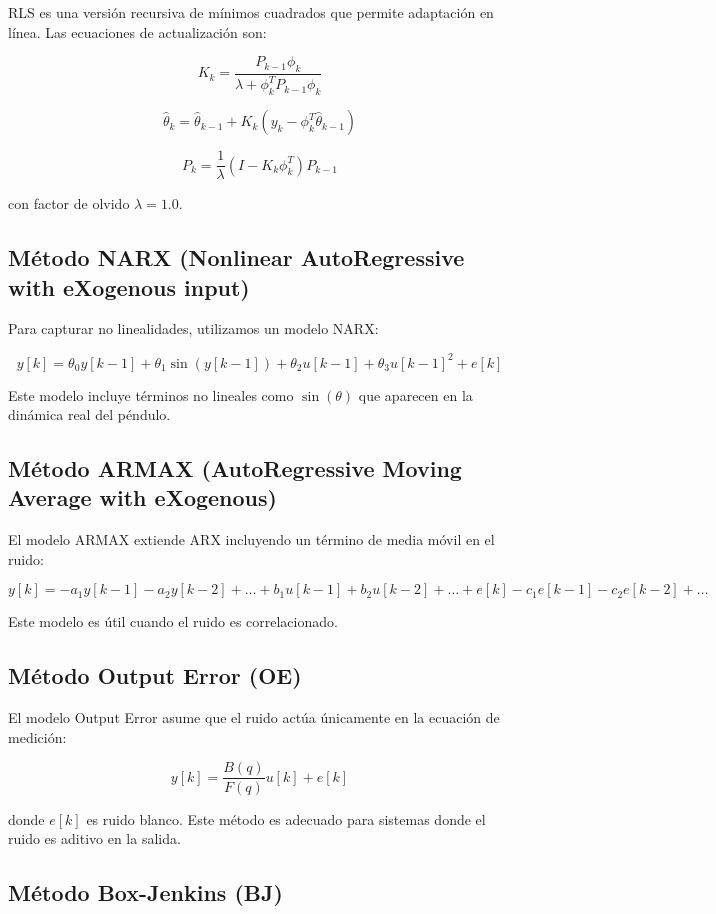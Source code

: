 \documentclass[a4paper,openright,9pt]{report}
\begin{document}
RLS es una versión recursiva de mínimos cuadrados que permite adaptación en línea. Las ecuaciones de actualización son:

\[
K_k = \frac{P_{k-1} \phi_k}{\lambda + \phi_k^T P_{k-1} \phi_k}
\]

\[
\hat{\theta}_k = \hat{\theta}_{k-1} + K_k (y_k - \phi_k^T \hat{\theta}_{k-1})
\]

\[
P_k = \frac{1}{\lambda} (I - K_k \phi_k^T) P_{k-1}
\]

con factor de olvido $\lambda = 1.0$.

\subsection{Método NARX (Nonlinear AutoRegressive with eXogenous input)}

Para capturar no linealidades, utilizamos un modelo NARX:

\[
y[k] = \theta_0 y[k-1] + \theta_1 \sin(y[k-1]) + \theta_2 u[k-1] + \theta_3 u[k-1]^2 + e[k]
\]

Este modelo incluye términos no lineales como $\sin(\theta)$ que aparecen en la dinámica real del péndulo.

\subsection{Método ARMAX (AutoRegressive Moving Average with eXogenous)}

El modelo ARMAX extiende ARX incluyendo un término de media móvil en el ruido:

\[
y[k] = -a_1 y[k-1] - a_2 y[k-2] + \dots + b_1 u[k-1] + b_2 u[k-2] + \dots + e[k] - c_1 e[k-1] - c_2 e[k-2] + \dots
\]

Este modelo es útil cuando el ruido es correlacionado.

\subsection{Método Output Error (OE)}

El modelo Output Error asume que el ruido actúa únicamente en la ecuación de medición:

\[
y[k] = \frac{B(q)}{F(q)} u[k] + e[k]
\]

donde $e[k]$ es ruido blanco. Este método es adecuado para sistemas donde el ruido es aditivo en la salida.

\subsection{Método Box-Jenkins (BJ)}
\end{document}
